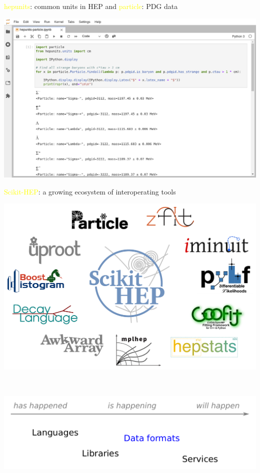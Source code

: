 \documentclass[aspectratio=169]{beamer}
\begin{document}
\begin{frame}{\textcolor{yellow}{hepunits}: common units in HEP and \textcolor{yellow}{particle}: PDG data}
\vspace{0.18 cm}
\begin{center}
\includegraphics[width=0.85\linewidth]{img/hepunits-particle.png}
\end{center}
\end{frame}

\begin{frame}{\textcolor{yellow}{Scikit-HEP}: a growing ecosystem of interoperating tools}
\vspace{0.15 cm}
\begin{center}
\includegraphics[width=0.85\linewidth]{img/ecosystem.pdf}
\end{center}
\end{frame}

\begin{frame}{\mbox{ }}
\vspace{0.5 cm}

\begin{center}
\includegraphics[width=0.9\linewidth]{img/topics-3.pdf}
\end{center}
\end{frame}
\end{document}
